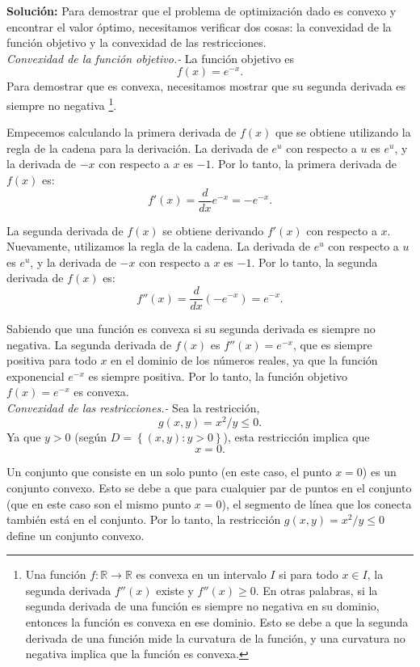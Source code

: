 \begin{enumerate}
\begin{enumerate}[\bfseries (a)]
	    \textbf{Solución:} Para demostrar que el problema de optimización dado es convexo y encontrar el valor óptimo, necesitamos verificar dos cosas: la convexidad de la función objetivo y la convexidad de las restricciones.\\

	    \textit{Convexidad de la función objetivo.-} La función objetivo es 
	    $$f(x) = e^{-x}.$$ 
	    Para demostrar que es convexa, necesitamos mostrar que su segunda derivada es siempre no negativa 
	    \footnote{
		Una función $f: \mathbb{R} \rightarrow \mathbb{R}$ es convexa en un intervalo $I$ si para todo $x \in I$, la segunda derivada $f''(x)$ existe y $f''(x) \geq 0$. En otras palabras, si la segunda derivada de una función es siempre no negativa en su dominio, entonces la función es convexa en ese dominio. Esto se debe a que la segunda derivada de una función mide la curvatura de la función, y una curvatura no negativa implica que la función es convexa.
	    }. 

	    Empecemos calculando la primera derivada de $f(x)$ que se obtiene utilizando la regla de la cadena para la derivación. La derivada de $e^u$ con respecto a $u$ es $e^u$, y la derivada de $-x$ con respecto a $x$ es $-1$. Por lo tanto, la primera derivada de $f(x)$ es:
	    $$f'(x) = \frac{d}{dx} e^{-x} = -e^{-x}.$$

	    La segunda derivada de $f(x)$ se obtiene derivando $f'(x)$ con respecto a $x$. Nuevamente, utilizamos la regla de la cadena. La derivada de $e^u$ con respecto a $u$ es $e^u$, y la derivada de $-x$ con respecto a $x$ es $-1$. Por lo tanto, la segunda derivada de $f(x)$ es:
	    $$f''(x) = \frac{d}{dx} (-e^{-x}) = e^{-x}.$$

	    Sabiendo que una función es convexa si su segunda derivada es siempre no negativa. La segunda derivada de $f(x)$ es $f''(x) = e^{-x}$, que es siempre positiva para todo $x$ en el dominio de los números reales, ya que la función exponencial $e^{-x}$ es siempre positiva. Por lo tanto, la función objetivo $f(x) = e^{-x}$ es convexa.\\

	    \textit{Convexidad de las restricciones.-} Sea la restricción,
	    $$g(x,y) = x^2/y \leq 0.$$ 
	     Ya que $y > 0$ (según $D=\left\{(x,y):y>0\right\}$), esta restricción implica que 
	     $$x = 0.$$ 

	    Un conjunto que consiste en un solo punto (en este caso, el punto $x = 0$) es un conjunto convexo. Esto se debe a que para cualquier par de puntos en el conjunto (que en este caso son el mismo punto $x = 0$), el segmento de línea que los conecta también está en el conjunto. Por lo tanto, la restricción $g(x,y) = x^2/y \leq 0$ define un conjunto convexo.\\


\end{enumerate}
\end{enumerate}
